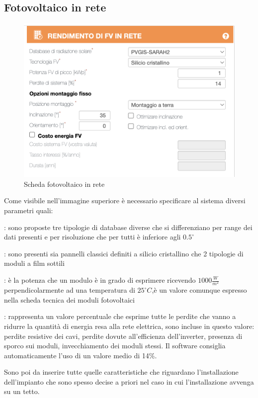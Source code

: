\subsection{Fotovoltaico in rete}
\begin{figure}[H]
    \centering
    \includegraphics[height=0.5\textwidth]{res/cap 4/Fotovoltaico statico}
    \caption{Scheda fotovoltaico in rete}
\end{figure}\noindent
Come visibile nell'immagine superiore è necessario specificare al sistema diversi parametri quali:
\begin{description}[labelindent=5mm]
    \item[$\bullet$ Database di radiazione solare]: sono proposte tre tipologie di database diverse che si differenziano per range dei dati presenti e per risoluzione che per tutti è inferiore agli {\large$0.5^{\circ}$}
    \item[$\bullet$ Tecnologia fotovoltaico]: sono presenti sia pannelli classici definiti a silicio cristallino che 2 tipologie di moduli a film sottili
    \item[$\bullet$ Potenza di picco]: è la potenza che un modulo è in grado di esprimere ricevendo {\large$1000\frac{W}{m^2}$} perpendicolarmente ad una temperatura di {\large$25^{\circ}C$},è un valore comunque espresso nella scheda tecnica dei moduli fotovoltaici
    \item[$\bullet$ Perdite di sistema]: rappresenta un valore percentuale che esprime tutte le perdite che vanno a ridurre la quantità di energia resa alla rete elettrica, sono incluse in questo valore: perdite resistive dei cavi, perdite dovute all'efficienza dell'inverter, presenza di sporco sui moduli, invecchiamento dei moduli stessi. Il software consiglia automaticamente l'uso di un valore medio di 14\%.
\end{description}
Sono poi da inserire tutte quelle caratteristiche che riguardano l'installazione dell'impianto che sono spesso decise a priori nel caso in cui l'installazione avvenga su un tetto.
